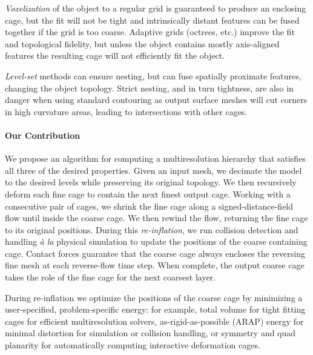 \emph{Voxelization} of the object to a regular grid is guaranteed to produce
an enclosing cage, but the fit will not be tight and intrinsically distant
features can be fused together if the grid is too coarse. Adaptive grids
(octrees, etc.) improve the fit and topological fidelity, but unless the object
contains mostly axis-aligned features the resulting cage will not efficiently
fit the object.

\emph{Level-set} methods can ensure nesting, but can fuse spatially proximate
features, changing the object topology. Strict nesting, and in turn tightness,
are also in danger when using standard contouring as output surface meshes will
cut corners in high curvature areas, leading to intersections with other
cages.

\paragraph{Our Contribution}
%
We propose an algorithm for computing a
multiresolution hierarchy that satisfies all three of the desired properties.
%
Given an input mesh, we decimate the model to the desired levels while
preserving its original topology.
%
We then recursively deform each fine cage to contain the next finest output
cage.
%
Working with a consecutive pair of cages,
we shrink the fine cage along a signed-distance-field flow until inside the
coarse cage.
%
We then rewind the flow, returning the fine cage to its original positions.
During this \emph{re-inflation}, we run collision detection and handling
\emph{à la} physical simulation to update the positions of the coarse
containing cage. Contact forces guarantee that the coarse cage always encloses
the reversing fine mesh at each reverse-flow time step.
%
When complete, the output coarse cage takes the role of the fine cage for the
next coarsest layer.

During re-inflation we optimize the positions of the coarse cage by minimizing
a user-specified, problem-specific energy: for example, total volume for tight fitting
cages for efficient multiresolution solvers, as-rigid-as-possible (ARAP) energy for
minimal distortion for simulation or collision handling, or symmetry and quad
planarity for automatically computing interactive deformation cages.




